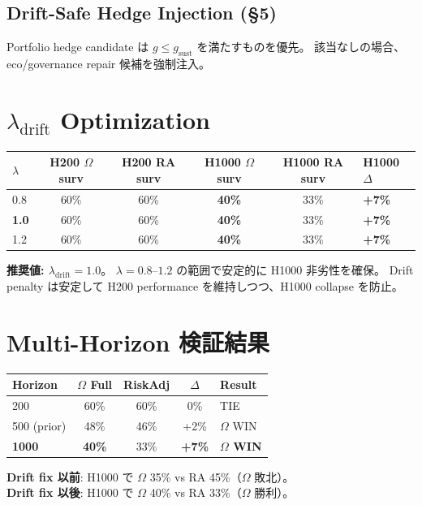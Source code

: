 \documentclass[11pt,a4paper]{article}
\begin{document}
\subsection{Drift-Safe Hedge Injection (\S5)}
Portfolio hedge candidate は $g \leq g_\text{sust}$ を満たすものを優先。
該当なしの場合、eco/governance repair 候補を強制注入。


\section{$\lambda_\text{drift}$ Optimization}

\begin{resultbox}
\begin{tabular}{@{}lccccl@{}}\toprule
$\lambda$ & H200 $\Omega$ surv & H200 RA surv & H1000 $\Omega$ surv & H1000 RA surv & H1000 $\Delta$ \\\midrule
0.8 & 60\% & 60\% & \textbf{40\%} & 33\% & \textbf{+7\%} \\
\textbf{1.0} & 60\% & 60\% & \textbf{40\%} & 33\% & \textbf{+7\%} \\
1.2 & 60\% & 60\% & \textbf{40\%} & 33\% & \textbf{+7\%} \\
\bottomrule\end{tabular}

\vspace{6pt}
\textbf{推奨値: $\lambda_\text{drift} = 1.0$}。
$\lambda = 0.8$--$1.2$ の範囲で安定的に H1000 非劣性を確保。
Drift penalty は安定して H200 performance を維持しつつ、H1000 collapse を防止。
\end{resultbox}


\section{Multi-Horizon 検証結果}

\begin{resultbox}
\begin{tabular}{@{}lcccl@{}}\toprule
\textbf{Horizon} & \textbf{$\Omega$ Full} & \textbf{RiskAdj} & \textbf{$\Delta$} & \textbf{Result} \\\midrule
200 & 60\% & 60\% & 0\% & TIE \\
500 (prior) & 48\% & 46\% & +2\% & $\Omega$ WIN \\
\textbf{1000} & \textbf{40\%} & 33\% & \textbf{+7\%} & \textbf{$\Omega$ WIN} \\
\bottomrule\end{tabular}

\vspace{6pt}
\textbf{Drift fix 以前}: H1000 で $\Omega$ 35\% vs RA 45\%（$\Omega$ 敗北）。\\
\textbf{Drift fix 以後}: H1000 で $\Omega$ 40\% vs RA 33\%（$\Omega$ 勝利）。
\end{resultbox}
\end{document}
